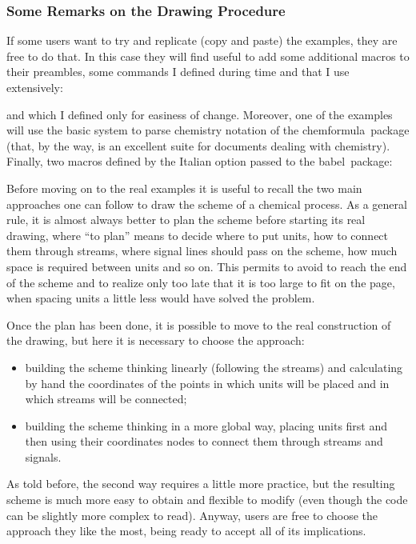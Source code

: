 \documentclass[12pt]{article}						%
\makeatletter
\providecommand*{\ap}[1]{%
		\textormath{\textsuperscript{#1}}{^{\mathrm{#1}}}%
	}
\providecommand*{\ped}[1]{%
		\textormath{$_{\mbox{\fontsize\sf@size\z@\selectfont#1}}$}{_\mathrm{#1}}%
	}
\renewcommand{\vec}[1]{\boldsymbol{#1}}			%
\newcommand*{\flow}[1]{\dot{#1}}					%
\newcommand*{\chemformula}{chemformula}
\newcommand*{\babel}{babel}
\makeatother
\begin{document}
\subsubsection{Some Remarks on the Drawing Procedure}

If some users want to try and replicate (copy and paste) the examples, they are
free to do that. In this case they will find useful to add some additional macros
to their preambles, some commands I defined during time and that I use
extensively:
\begin{chpcode}
	\renewcommand{\vec}[1]{\boldsymbol{#1}}	%
	\newcommand{\flow}[1]{\dot{#1}}			%
\end{chpcode}
and which I defined only for easiness of change. Moreover, one of the examples
will use the basic system to parse chemistry notation of the \chemformula\
package (that, by the way, is an excellent suite for documents dealing with
chemistry). Finally, two macros defined by the Italian option passed to the
\babel\ package:
\begin{chpcode}
	\providecommand*{\ap}[1]{%
		\textormath{%
			\textsuperscript{#1}%
		}%
		{%
			^{\mathrm{#1}}%
		}%
	}
	\providecommand*{\ped}[1]{%
		\textormath{%
			$_{\mbox{\fontsize\sf@size\z@\selectfont#1}}$%
		}%
		{%
			_\mathrm{#1}%
		}%
	}
\end{chpcode}

Before moving on to the real examples it is useful to recall the two main
approaches one can follow to draw the scheme of a chemical process. As a general
rule, it is almost always better to plan the scheme before starting its real
drawing, where ``to plan'' means to decide where to put units, how to connect
them through streams, where signal lines should pass on the scheme, how much
space is required between units and so on. This permits to avoid to reach the end
of the scheme and to realize only too late that it is too large to fit on the
page, when spacing units a little less would have solved the problem.

Once the plan has been done, it is possible to move to the real construction of
the drawing, but here it is necessary to choose the approach:
\begin{itemize}
	\item building the scheme thinking linearly (following the streams) and
		calculating by hand the coordinates of the points in which units will
		be placed and in which streams will be connected;
	\item building the scheme thinking in a more global way, placing units first
		and then using their coordinates nodes to connect them through streams
		and signals.
\end{itemize}
As told before, the second way requires a little more practice, but the
resulting scheme is much more easy to obtain and flexible to modify (even though
the code can be slightly more complex to read). Anyway, users are free to choose
the approach they like the most, being ready to accept all of its implications.
\end{document}

